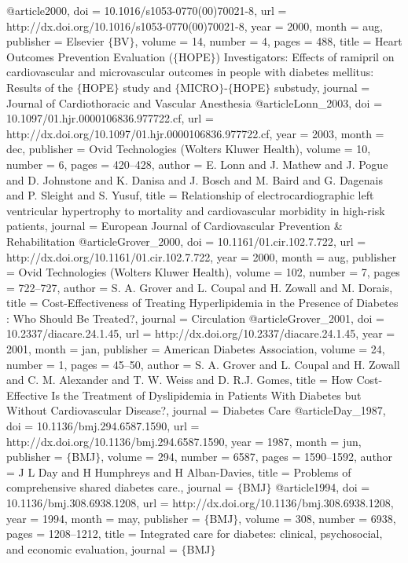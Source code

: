 @article{2000,
	doi = {10.1016/s1053-0770(00)70021-8},
	url = {http://dx.doi.org/10.1016/s1053-0770(00)70021-8},
	year = 2000,
	month = {aug},
	publisher = {Elsevier $\lbrace$BV$\rbrace$},
	volume = {14},
	number = {4},
	pages = {488},
	title = {Heart Outcomes Prevention Evaluation ($\lbrace$HOPE$\rbrace$) Investigators: Effects of ramipril on cardiovascular and microvascular outcomes in people with diabetes mellitus: Results of the $\lbrace$HOPE$\rbrace$ study and $\lbrace$MICRO$\rbrace$-$\lbrace$HOPE$\rbrace$ substudy},
	journal = {Journal of Cardiothoracic and Vascular Anesthesia}
}
@article{Lonn_2003,
	doi = {10.1097/01.hjr.0000106836.977722.cf},
	url = {http://dx.doi.org/10.1097/01.hjr.0000106836.977722.cf},
	year = 2003,
	month = {dec},
	publisher = {Ovid Technologies (Wolters Kluwer Health)},
	volume = {10},
	number = {6},
	pages = {420--428},
	author = {E. Lonn and J. Mathew and J. Pogue and D. Johnstone and K. Danisa and J. Bosch and M. Baird and G. Dagenais and P. Sleight and S. Yusuf},
	title = {Relationship of electrocardiographic left ventricular hypertrophy to mortality and cardiovascular morbidity in high-risk patients},
	journal = {European Journal of Cardiovascular Prevention {\&} Rehabilitation}
}
@article{Grover_2000,
	doi = {10.1161/01.cir.102.7.722},
	url = {http://dx.doi.org/10.1161/01.cir.102.7.722},
	year = 2000,
	month = {aug},
	publisher = {Ovid Technologies (Wolters Kluwer Health)},
	volume = {102},
	number = {7},
	pages = {722--727},
	author = {S. A. Grover and L. Coupal and H. Zowall and M. Dorais},
	title = {Cost-Effectiveness of Treating Hyperlipidemia in the Presence of Diabetes : Who Should Be Treated?},
	journal = {Circulation}
}
@article{Grover_2001,
	doi = {10.2337/diacare.24.1.45},
	url = {http://dx.doi.org/10.2337/diacare.24.1.45},
	year = 2001,
	month = {jan},
	publisher = {American Diabetes Association},
	volume = {24},
	number = {1},
	pages = {45--50},
	author = {S. A. Grover and L. Coupal and H. Zowall and C. M. Alexander and T. W. Weiss and D. R.J. Gomes},
	title = {How Cost-Effective Is the Treatment of Dyslipidemia in Patients With Diabetes but Without Cardiovascular Disease?},
	journal = {Diabetes Care}
}
@article{Day_1987,
	doi = {10.1136/bmj.294.6587.1590},
	url = {http://dx.doi.org/10.1136/bmj.294.6587.1590},
	year = 1987,
	month = {jun},
	publisher = {$\lbrace$BMJ$\rbrace$},
	volume = {294},
	number = {6587},
	pages = {1590--1592},
	author = {J L Day and H Humphreys and H Alban-Davies},
	title = {Problems of comprehensive shared diabetes care.},
	journal = {$\lbrace$BMJ$\rbrace$}
}
@article{1994,
	doi = {10.1136/bmj.308.6938.1208},
	url = {http://dx.doi.org/10.1136/bmj.308.6938.1208},
	year = 1994,
	month = {may},
	publisher = {$\lbrace$BMJ$\rbrace$},
	volume = {308},
	number = {6938},
	pages = {1208--1212},
	title = {Integrated care for diabetes: clinical, psychosocial, and economic evaluation},
	journal = {$\lbrace$BMJ$\rbrace$}
}
